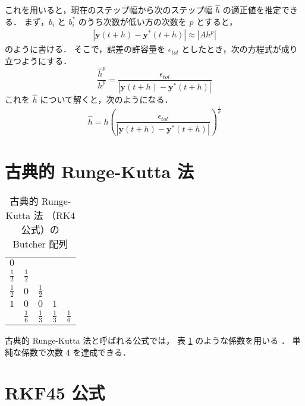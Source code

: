 これを用いると，現在のステップ幅から次のステップ幅 $\hat{h}$ の適正値を推定できる．
まず，$b_i$ と $b_i^*$ のうち次数が低い方の次数を $p$ とすると，
\begin{align}
    \left| \bm{y}(t + h) - \bm{y}^*(t + h) \right| \approx |Ah^p|
\end{align}
のように書ける．
そこで，誤差の許容量を $\epsilon_{tol}$ としたとき，次の方程式が成り立つようにする．
\begin{equation}
    \frac{\hat{h}^p}{h^p} = \frac{\epsilon_{tol}}{\left| \bm{y}(t + h) - \bm{y}^*(t + h) \right|}
\end{equation}
これを $\hat{h}$ について解くと，次のようになる．
\begin{equation}
    \hat{h} = h \left(\frac{\epsilon_{tol}}{\left| \bm{y}(t + h) - \bm{y}^*(t + h) \right|}\right)^{\frac{1}{p}}
\end{equation}

\section{古典的 Runge-Kutta 法}

\begin{table}[bp]
    \caption{古典的 Runge-Kutta 法 （RK4 公式）の Butcher 配列}
    \label{table:ode_runge-kutta_butcher-array-rk4}
    \centering
    \begin{tabular}{c|cccc}
        $0$           &               &               &               &               \\
        $\frac{1}{2}$ & $\frac{1}{2}$ &               &               &               \\
        $\frac{1}{2}$ & $0$           & $\frac{1}{2}$ &               &               \\
        $1$           & $0$           & $0$           & $1$           &               \\
        \hline
                      & $\frac{1}{6}$ & $\frac{1}{3}$ & $\frac{1}{3}$ & $\frac{1}{6}$
    \end{tabular}
\end{table}

古典的 Runge-Kutta 法と呼ばれる公式では，
表 \ref{table:ode_runge-kutta_butcher-array-rk4} のような係数を用いる
\cite[3.3 節]{Mitsui1993}．
単純な係数で次数 4 を達成できる．

\section{RKF45 公式}

